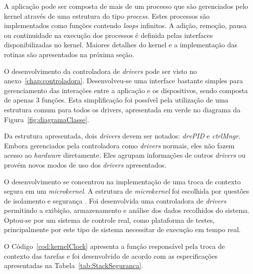 \documentclass[12pt,openright,oneside,a4paper,brazil]{abntex2}
\begin{document}
A aplicação pode ser composta de mais de um processo que são gerenciados pelo kernel através de uma estrutura do tipo \textit{process}. Estes processos são implementados como funções contendo \textit{loops} infinitos. A adição, remoção, pausa ou continuidade na execução dos processos é definida pelas interfaces disponibilizadas no kernel. Maiores detalhes do kernel e a implementação das rotinas são apresentados na próxima seção.

O desenvolvimento da controladora de \textit{drivers} pode ser visto no anexo~\ref{chap:controladora}. Desenvolveu-se uma interface bastante simples para gerenciamento das interações entre a aplicação e os dispositivos, sendo composta de apenas 3 funções. Esta simplificação foi possível pela utilização de uma estrutura comum para todos os drivers, apresentada em verde no diagrama da Figura~\ref{fig:diagramaClasse}.

Da estrutura apresentada, dois \textit{drivers} devem ser notados: \textit{drvPID} e \textit{ctrlMngr}. Embora gerenciados pela controladora como \textit{drivers} normais, eles não fazem acesso ao \textit{hardware} diretamente. Eles agrupam informações de outros \textit{drivers} ou provém novos modos de uso dos \textit{drivers} apresentados. 

O desenvolvimento se concentrou na implementação de uma troca de contexto segura em um \textit{microkernel}. A estrutura de \textit{microkernel} foi escolhida por questões de isolamento e segurança \cite{tanenbaum2006can}. Foi desenvolvida uma controladora de \textit{drivers} permitindo a exibição, armazenamento e análise dos dados recolhidos do sistema. Optou-se por um sistema de controle real, como plataforma de testes, principalmente por este tipo de sistema necessitar de execução em tempo real.

O Código~\ref{cod:kernelClock} apresenta a função responsável pela troca de contexto das tarefas e foi desenvolvido de acordo com as especificações apresentadas na Tabela~\ref{tab:StackSeguranca}.
\end{document}
